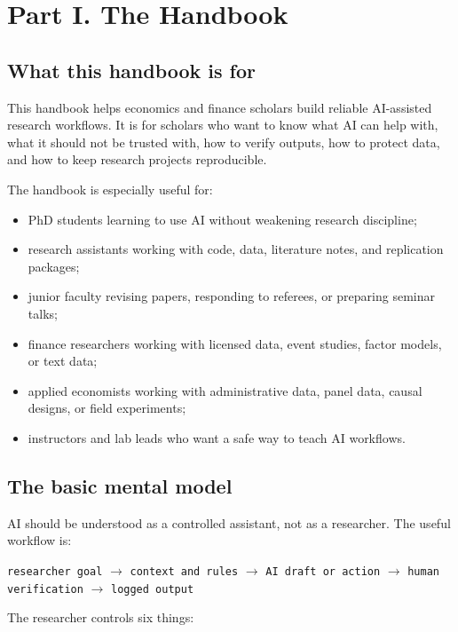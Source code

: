 \documentclass[11pt]{article}
\begin{document}
\section{Part I. The Handbook}

\subsection{What this handbook is for}

This handbook helps economics and finance scholars build reliable AI-assisted research workflows. It is for scholars who want to know what AI can help with, what it should not be trusted with, how to verify outputs, how to protect data, and how to keep research projects reproducible.

The handbook is especially useful for:

\begin{itemize}[leftmargin=2em]
  \item PhD students learning to use AI without weakening research discipline;
  \item research assistants working with code, data, literature notes, and replication packages;
  \item junior faculty revising papers, responding to referees, or preparing seminar talks;
  \item finance researchers working with licensed data, event studies, factor models, or text data;
  \item applied economists working with administrative data, panel data, causal designs, or field experiments;
  \item instructors and lab leads who want a safe way to teach AI workflows.
\end{itemize}

\subsection{The basic mental model}

AI should be understood as a controlled assistant, not as a researcher. The useful workflow is:

\begin{center}
\texttt{researcher goal} \(\rightarrow\) \texttt{context and rules} \(\rightarrow\) \texttt{AI draft or action} \(\rightarrow\) \texttt{human verification} \(\rightarrow\) \texttt{logged output}
\end{center}

The researcher controls six things:
\end{document}
